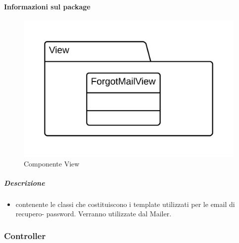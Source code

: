  \paragraph{Informazioni sul package} 
    \begin{figure}[H] 
      \begin{center} 
        \includegraphics[width=\textwidth]{uml/package/Back-end::Lib::View.png}  
        \caption{Componente View}
      \end{center}  
    \end{figure} 
  \subparagraph{Descrizione} 
    \begin{itemize}
    \item[]  contenente le classi che costituiscono i template utilizzati per le email di recupero-
password. Verranno utilizzate dal  Mailer.

    \end{itemize} 
  \subsubsection{Controller}
